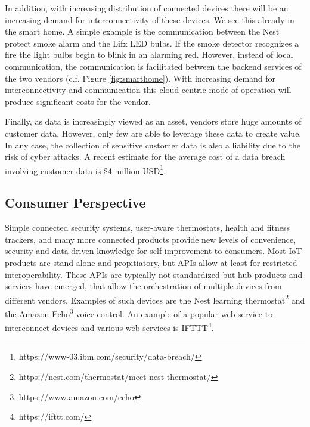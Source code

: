 In addition, with increasing distribution of connected devices there will be an increasing demand for interconnectivity of these devices. We see this already in the smart home. A simple example is the communication between the Nest protect smoke alarm and the Lifx LED bulbs. If the smoke detector recognizes a fire the light bulbs begin to blink in an alarming red. However, instead of local communication, the communication is facilitated between the backend services of the two vendors (c.f. Figure \ref{fig:smarthome}). With increasing demand for interconnectivity and communication this cloud-centric mode of operation will produce significant costs for the vendor.

Finally, as data is increasingly viewed as an asset, vendors store huge amounts of customer data. However, only few are able to leverage these data to create value. In any case, the collection of sensitive customer data is also a liability due to the risk of cyber attacks. A recent estimate for the average cost of a data breach involving customer data is \$4 million USD\footnote{https://www-03.ibm.com/security/data-breach/}.


\subsection{Consumer Perspective}

Simple connected security systems, user-aware thermostats, health and fitness trackers, and many more connected products provide new levels of convenience, security and data-driven knowledge for self-improvement to consumers. Most IoT products are stand-alone and propitiatory, but APIs allow at least for restricted interoperability. These APIs are typically not standardized but hub products and services have emerged, that allow the orchestration of multiple devices from different vendors. Examples of such devices are the Nest learning thermostat\footnote{https://nest.com/thermostat/meet-nest-thermostat/} and the Amazon Echo\footnote{https://www.amazon.com/echo} voice control. An example of a popular web service to interconnect devices and various web services is IFTTT\footnote{https://ifttt.com/}. 

